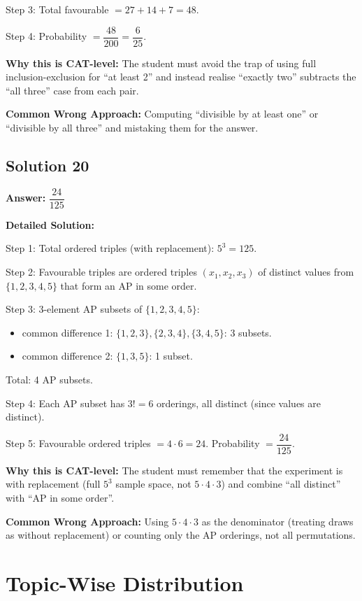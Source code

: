 \documentclass[11pt]{article}
\begin{document}
Step 3: Total favourable \( = 27 + 14 + 7 = 48 \).

Step 4: Probability \( = \dfrac{48}{200} = \dfrac{6}{25} \).

\textbf{Why this is CAT-level:} The student must avoid the trap of using full inclusion-exclusion for ``at least 2'' and instead realise ``exactly two'' subtracts the ``all three'' case from each pair.

\textbf{Common Wrong Approach:} Computing ``divisible by at least one'' or ``divisible by all three'' and mistaking them for the answer.

\subsection*{Solution 20}
\textbf{Answer:} \( \dfrac{24}{125} \)

\textbf{Detailed Solution:}

Step 1: Total ordered triples (with replacement): \( 5^3 = 125 \).

Step 2: Favourable triples are ordered triples \( (x_1, x_2, x_3) \) of distinct values from \( \{1,2,3,4,5\} \) that form an AP in some order.

Step 3: 3-element AP subsets of \( \{1,2,3,4,5\} \):
\begin{itemize}
\item common difference 1: \( \{1,2,3\}, \{2,3,4\}, \{3,4,5\} \): 3 subsets.
\item common difference 2: \( \{1,3,5\} \): 1 subset.
\end{itemize}
Total: 4 AP subsets.

Step 4: Each AP subset has \( 3! = 6 \) orderings, all distinct (since values are distinct).

Step 5: Favourable ordered triples \( = 4 \cdot 6 = 24 \). Probability \( = \dfrac{24}{125} \).

\textbf{Why this is CAT-level:} The student must remember that the experiment is with replacement (full \( 5^3 \) sample space, not \( 5 \cdot 4 \cdot 3 \)) and combine ``all distinct'' with ``AP in some order''.

\textbf{Common Wrong Approach:} Using \( 5 \cdot 4 \cdot 3 \) as the denominator (treating draws as without replacement) or counting only the AP orderings, not all permutations.

\newpage

\section*{Topic-Wise Distribution}
\end{document}

